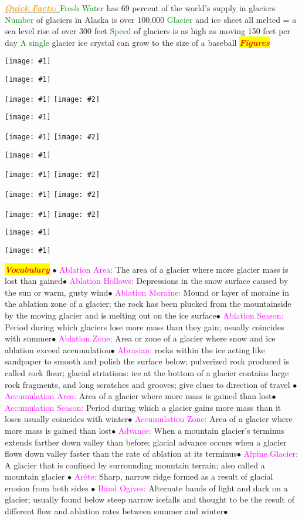 \documentclass{article}
\newcommand{\ddd}{$\bullet$}
\newcommand{\red}[1]{\textcolor{red}{#1}}
\newcommand{\green}[1]{\textcolor{green}{#1}}
\newcommand{\pink}[1]{\textcolor{magenta}{#1}}
\newcommand{\orange}[1]{\textcolor{orange}{#1}}
\newcommand{\mysection}[1]{\colorbox{yellow}{\textbf{\textit{\red{#1}}}}}
\newcommand{\mysub}[1]{\underline{\textbf{{\textit{\orange{#1}}}}}}
\newcommand{\mysubsub}[1]{{{\green{#1}}}}
\newcommand{\vocab}[1]{{\pink{#1}}}
\newcommand{\fig}[1]{
	\texttt{[image: \#1]}
}
\newcommand{\figwidth}[2]{
	\texttt{[image: \#1]}
}
\newcommand{\figtwo}[2]{
	\texttt{[image: \#1]}
	\texttt{[image: \#2]}
}
\begin{document}
\begin{multicols*}{4}
		    \mysub{Quick Facts: }
		    \mysubsub{Fresh Water} has 69 percent of the world's supply in glaciers
		    \mysubsub{Number} of glaciers in Alaska is over 100,000
		    \mysubsub{Glacier} and ice sheet all melted = a sea level rise of over 300 feet
		    \mysubsub{Speed} of glaciers is as high as moving 150 feet per day
		    \mysubsub{A single} glacier ice crystal can grow to the size of a baseball
	\mysection{Figures}
	\fig{iceshelf_locations}
	\fig{othersea}
	\figtwo{arctic}{lgm}
	\fig{na}
	\figtwo{corrie}{milan}
	\fig{seaice}
	\figtwo{southern}{greenland}
	\figtwo{fjord}{glacier}
	\figtwo{lauren}{cordi}
	\fig{wordlmap}
	\figwidth{filler}{5}
	\pagebreak
	
	\mysection{Vocabulary} 
		\ddd
		\vocab{        Ablation Area: } The area of a glacier where more glacier mass is lost than gained\ddd
		\vocab{        Ablation Hollows: } Depressions in the snow surface caused by the sun or warm, gusty wind\ddd
		\vocab{        Ablation Moraine: } Mound or layer of moraine in the ablation zone of a glacier; the rock has been plucked from the mountainside by the moving glacier and is melting out on the ice surface\ddd
		\vocab{        Ablation Season: } Period during which glaciers lose more mass than they gain; usually coincides with summer\ddd
		\vocab{        Ablation Zone: } Area or zone of a glacier where snow and ice ablation exceed accumulation\ddd
		\vocab{Abrasian: } rocks within the ice acting like sandpaper to smooth and polish the surface below; pulverized rock produced is called rock flour; glacial striations: ice at the bottom of a glacier contains large rock fragments, and long scratches and grooves; give clues to direction of travel \ddd
		\vocab{        Accumulation Area: } Area of a glacier where more mass is gained than lost\ddd
		\vocab{        Accumulation Season: } Period during which a glacier gains more mass than it loses usually coincides with winter\ddd
		\vocab{        Accumulation Zone: } Area of a glacier where more mass is gained than lost\ddd
		\vocab{        Advance: } When a mountain glacier’s terminus extends farther down valley than before; glacial advance occurs when a glacier flows down valley faster than the rate of ablation at its terminus\ddd
		\vocab{        Alpine Glacier: } A glacier that is confined by surrounding mountain terrain; also called a mountain glacier \ddd
		\vocab{        Arête: } Sharp, narrow ridge formed as a result of glacial erosion from both sides \ddd 
		\vocab{        Band Ogives: } Alternate bands of light and dark on a glacier; usually found below steep narrow icefalls and thought to be the result of different flow and ablation rates between summer and winter\ddd

\end{multicols*}
\end{document}
